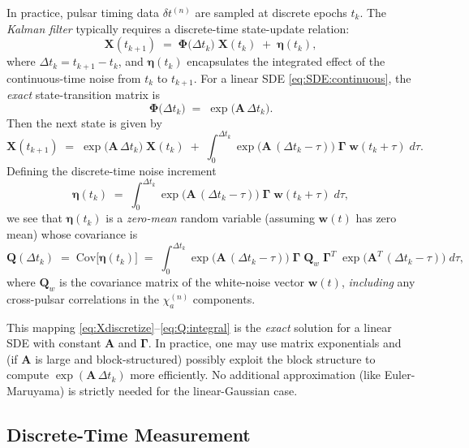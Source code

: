 \documentclass[]{scrartcl}
\begin{document}
In practice, pulsar timing data $\delta t^{(n)}$ are sampled at discrete epochs $t_k$.  The \emph{Kalman filter} typically requires a discrete-time state-update relation:
\[
\mathbf{X}(t_{k+1})
\;=\;
\mathbf{\Phi}\bigl(\Delta t_k\bigr)\;\mathbf{X}(t_{k})
\;+\;
\boldsymbol{\eta}(t_{k}),
\]
where $\Delta t_k = t_{k+1} - t_k$, and $\boldsymbol{\eta}(t_k)$ encapsulates the integrated effect of the continuous-time noise from $t_k$ to $t_{k+1}$.  For a linear SDE \eqref{eq:SDE:continuous}, the \emph{exact} state-transition matrix is
\[
\mathbf{\Phi}\bigl(\Delta t_k\bigr)
\;=\;
\exp\!\bigl(\mathbf{A}\,\Delta t_k\bigr).
\]
Then the next state is given by
\begin{equation}
\label{eq:Xdiscretize}
\mathbf{X}(t_{k+1})
\;=\;
\exp\!\bigl(\mathbf{A}\,\Delta t_k\bigr)\;\mathbf{X}(t_k)
\;+\;
\int_{0}^{\Delta t_k}
\exp\!\bigl(\mathbf{A}\,(\Delta t_k - \tau)\bigr)
\;\mathbf{\Gamma}\;\mathbf{w}(t_k + \tau)\;d\tau.
\end{equation}
Defining the discrete-time noise increment
\[
\boldsymbol{\eta}(t_k)
\;=\;
\int_{0}^{\Delta t_k}
\exp\!\bigl(\mathbf{A}\,(\Delta t_k - \tau)\bigr)
\;\mathbf{\Gamma}\;\mathbf{w}(t_k + \tau)\;d\tau,
\]
we see that $\boldsymbol{\eta}(t_k)$ is a \emph{zero-mean} random variable (assuming $\mathbf{w}(t)$ has zero mean) whose covariance is
\begin{equation}
\label{eq:Q:integral}
\mathbf{Q}(\Delta t_k)
\;=\;
\mathrm{Cov}\bigl[\boldsymbol{\eta}(t_k)\bigr]
\;=\;
\int_{0}^{\Delta t_k}
\exp\!\bigl(\mathbf{A}\,(\Delta t_k - \tau)\bigr)
\;\mathbf{\Gamma}\;\mathbf{Q}_{w}\;\mathbf{\Gamma}^{T}
\;\exp\!\bigl(\mathbf{A}^{T}\,(\Delta t_k - \tau)\bigr)
\;d\tau,
\end{equation}
where $\mathbf{Q}_w$ is the covariance matrix of the white-noise vector $\mathbf{w}(t)$, \emph{including} any cross-pulsar correlations in the $\chi_a^{(n)}$ components.

This mapping \eqref{eq:Xdiscretize}--\eqref{eq:Q:integral} is the \emph{exact} solution for a linear SDE with constant $\mathbf{A}$ and $\mathbf{\Gamma}$.  In practice, one may use matrix exponentials and (if $\mathbf{A}$ is large and block-structured) possibly exploit the block structure to compute $\exp(\mathbf{A}\,\Delta t_k)$ more efficiently.  No additional approximation (like Euler-Maruyama) is strictly needed for the linear-Gaussian case.

\subsection{Discrete-Time Measurement}
\end{document}
